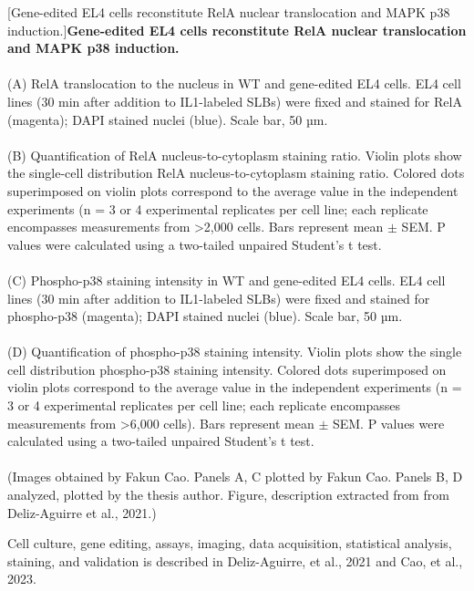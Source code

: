 \begin{centering}
\captionsetup{parbox=none}
[Gene-edited EL4 cells reconstitute RelA nuclear translocation and MAPK p38 induction.]{\textbf{Gene-edited EL4 cells reconstitute RelA nuclear translocation and MAPK p38 induction.}
\\
\\
(A) RelA translocation to the nucleus in WT and gene-edited EL4 cells. EL4 cell lines (30 min after addition to IL1{\textbeta}-labeled SLBs) were fixed and stained for RelA (magenta); DAPI stained nuclei (blue). Scale bar, 50 µm.
\\
\\
(B) Quantification of RelA nucleus-to-cytoplasm staining ratio. Violin plots show the single-cell distribution RelA nucleus-to-cytoplasm staining ratio. Colored dots superimposed on violin plots correspond to the average value in the independent experiments (n = 3 or 4 experimental replicates per cell line; each replicate encompasses measurements from >2,000 cells. Bars represent mean $\pm$ SEM. P values were calculated using a two-tailed unpaired Student's t test.
\\
\\
(C) Phospho-p38 staining intensity in WT and gene-edited EL4 cells. EL4 cell lines (30 min after addition to IL1{\textbeta}-labeled SLBs) were fixed and stained for phospho-p38 (magenta); DAPI stained nuclei (blue). Scale bar, 50 µm.
\\
\\
(D) Quantification of phospho-p38 staining intensity. Violin plots show the single cell distribution phospho-p38 staining intensity. Colored dots superimposed on violin plots correspond to the average value in the independent experiments (n = 3 or 4 experimental replicates per cell line; each replicate encompasses measurements from >6,000 cells). Bars represent mean $\pm$ SEM. P values were calculated using a two-tailed unpaired Student's t test.
\\
\\
(Images obtained by Fakun Cao. Panels A, C plotted by Fakun Cao. Panels B, D analyzed, plotted by the thesis author. Figure, description extracted from from Deliz-Aguirre et al., 2021.)}
\label{p1:S2}
\end{centering}

Cell culture, gene editing, assays, imaging, data acquisition, statistical analysis, staining, and validation is described in Deliz-Aguirre, et al., 2021 and Cao, et al., 2023. 


